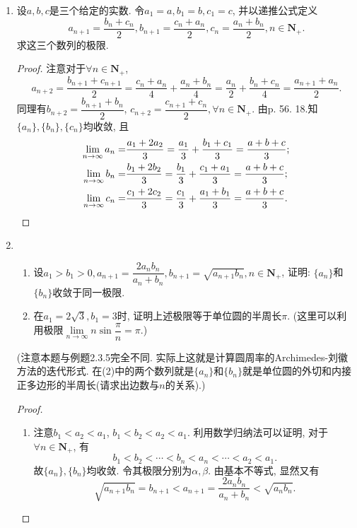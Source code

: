 \documentclass[a4paper,11pt,twoside]{ctexbook}
\begin{document}
\begin{enumerate}
	\item 设$a,b,c$是三个给定的实数. 令$a_1=a, b_1=b, c_1=c$, 并以递推公式定义
	      \[
		      a_{n+1}=\dfrac{b_n+c_n}{2}, b_{n+1}=\dfrac{c_n+a_n}{2}, c_n=\dfrac{a_n+b_n}{2}, n\in\mathbf{N}_{+}.
	      \]
	      求这三个数列的极限.
	      \begin{proof}
		      注意对于$\forall n\in\mathbf{N}_{+}$,
		      \[
			      a_{n+2}=\dfrac{b_{n+1}+c_{n+1}}{2}=\dfrac{c_n+a_n}{4}+\dfrac{a_n+b_n}{4}=\dfrac{a_n}{2}+\dfrac{b_n+c_n}{4}=\dfrac{a_{n+1}+a_{n}}{2}.
		      \]
		      同理有$b_{n+2}=\dfrac{b_{n+1}+b_n}{2}$, $c_{n+2}=\dfrac{c_{n+1}+c_n}{2}, \forall n\in\mathbf{N}_{+}$. 由p. 56. 18.知$\{a_n\}, \{b_n\}, \{c_n\}$均收敛, 且
		      \[
			      \begin{split}
				      \lim\limits_{n\to\infty} a_n=&\dfrac{a_1+2a_2}{3}=\dfrac{a_1}{3}+\dfrac{b_1+c_1}{3}=\dfrac{a+b+c}{3};\\
				      \lim\limits_{n\to\infty} b_n=&\dfrac{b_1+2b_2}{3}=\dfrac{b_1}{3}+\dfrac{c_1+a_1}{3}=\dfrac{a+b+c}{3};\\
				      \lim\limits_{n\to\infty} c_n=&\dfrac{c_1+2c_2}{3}=\dfrac{c_1}{3}+\dfrac{a_1+b_1}{3}=\dfrac{a+b+c}{3}. \qedhere
			      \end{split}
		      \]
	      \end{proof}
	\item
	      \begin{enumerate}[(1)]
		      \item 设$a_1>b_1>0, a_{n+1}=\dfrac{2a_nb_n}{a_n+b_n}, b_{n+1}=\sqrt{a_{n+1}b_n}, n\in\mathbf{N}_{+}$, 证明: $\{a_n\}$和$\{b_n\}$收敛于同一极限.
		      \item 在$a_1=2\sqrt{3}, b_1=3$时, 证明上述极限等于单位圆的半周长$\pi$. (这里可以利用极限$\lim\limits_{n\to\infty} n\sin{\dfrac{\pi}{n}}=\pi$.)
	      \end{enumerate}
	      (注意本题与例题2.3.5完全不同. 实际上这就是计算圆周率的Archimedes-刘徽方法的迭代形式. 在(2)中的两个数列就是$\{a_n\}$和$\{b_n\}$就是单位圆的外切和内接正多边形的半周长(请求出边数与$n$的关系).)
	      \begin{proof}
		      \begin{enumerate}[(1)]
			      \item 注意$b_1<a_2<a_1$, $b_1<b_2<a_2<a_1$. 利用数学归纳法可以证明, 对于$\forall n\in\mathbf{N}_{+}$, 有
			            \[
				            b_1<b_2<\cdots<b_n<a_n<\cdots<a_2<a_1.
			            \]
			            故$\{a_n\}, \{b_n\}$均收敛. 令其极限分别为$\alpha, \beta$. 由基本不等式, 显然又有
			            \[
				            \sqrt{a_{n+1}b_n}=b_{n+1}<a_{n+1}=\dfrac{2a_nb_n}{a_n+b_n}<\sqrt{a_nb_n}.
\]
\end{enumerate}
\end{proof}
\end{enumerate}
\end{document}
